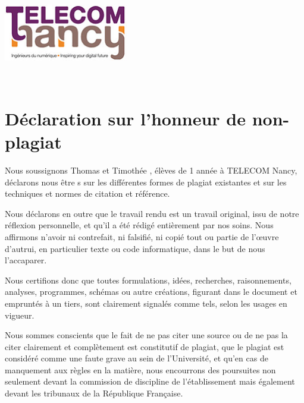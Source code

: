 \documentclass[a4paper, 11pt, twoside]{book}
\renewcommand{\tn}{TELECOM Nancy}
\newcommand{\fisa}{\sc{fisa}}
\begin{document}
\begin{titlepage}

\includegraphics[height=2.5cm]{resources/logo_tn.jpg}\\[1cm]

\vfill{}
\end{titlepage}
\clearpage{}


~\vfill
\clearpage{}


\pagestyle{plain}
\section*{Déclaration sur l'honneur de non-plagiat}

Nous soussignons Thomas  et Timothée , élèves de 1 année \fisa{} à \tn{}, déclarons nous être s sur les différentes formes de plagiat existantes et sur les techniques et normes de citation et référence.

Nous déclarons en outre que le travail rendu est un travail original, issu de notre réflexion personnelle, et qu'il a été rédigé entièrement par nos soins. Nous affirmons n'avoir ni contrefait, ni falsifié, ni copié tout ou partie de l'\oe{}uvre d'autrui, en particulier texte ou code informatique, dans le but de nous l'accaparer.

Nous certifions donc que toutes formulations, idées, recherches, raisonnements, analyses, programmes, schémas ou autre créations, figurant dans le document et empruntés à un tiers, sont clairement signalés comme tels, selon les usages en vigueur.

Nous sommes conscients que le fait de ne pas citer une source ou de ne pas la citer clairement et complètement est constitutif de plagiat, que le plagiat est considéré comme une faute grave au sein de l'Université, et qu'en cas de manquement aux règles en la matière, nous encourrons des poursuites non seulement devant la commission de discipline de l'établissement mais également devant les tribunaux de la République Fran\c{c}aise.
\end{document}
